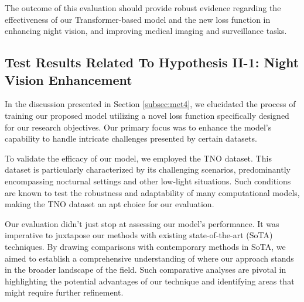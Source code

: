 The outcome of this evaluation should provide robust evidence regarding the effectiveness of our Transformer-based model and the new loss function in enhancing night vision, and improving medical imaging and surveillance tasks.

\subsection{Test Results Related To Hypothesis II-1: Night Vision Enhancement} \label{subsec:met4res}

In the discussion presented in Section \ref{subsec:met4}, we elucidated the process of training our proposed model utilizing a novel loss function specifically designed for our research objectives. Our primary focus was to enhance the model's capability to handle intricate challenges presented by certain datasets.

To validate the efficacy of our model, we employed the TNO dataset. This dataset is particularly characterized by its challenging scenarios, predominantly encompassing nocturnal settings and other low-light situations. Such conditions are known to test the robustness and adaptability of many computational models, making the TNO dataset an apt choice for our evaluation.

Our evaluation didn't just stop at assessing our model's performance. It was imperative to juxtapose our methods with existing state-of-the-art (SoTA) techniques. By drawing comparisons with contemporary methods in SoTA, we aimed to establish a comprehensive understanding of where our approach stands in the broader landscape of the field. Such comparative analyses are pivotal in highlighting the potential advantages of our technique and identifying areas that might require further refinement.

